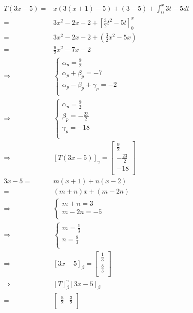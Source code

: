 \documentclass{article}
\begin{document}
\begin{equation*}
\begin{split}
T(3x-5) =&x(3(x+1)-5)+(3-5)+\int^x_0 3t-5 dt\\
=&3x^2-2x-2+\left[\frac{3}{2}t^2-5t\right]^x_0\\
=&3x^2-2x-2+(\frac{3}{2}x^2-5x)\\
=&\frac{9}{2}x^2-7x-2\\
\Rightarrow &\begin{cases}
\alpha_p=\frac{9}{2}\\
\alpha_p+\beta_p=-7\\
\alpha_p-\beta_p+\gamma_p=-2\\
\end{cases}\\
\Rightarrow &\begin{cases}
\alpha_p=\frac{9}{2}\\
\beta_p=-\frac{23}{2}\\
\gamma_p=-18\\
\end{cases}\\
\Rightarrow &\left[T(3x-5)\right]_\gamma=\begin{bmatrix}
\frac{9}{2}\\
-\frac{23}{2}\\
-18\\
\end{bmatrix}\\
3x-5 =& m(x+1)+n(x-2)\\
=&(m+n)x+(m-2n)\\
\Rightarrow &\begin{cases}
m+n=3\\
m-2n=-5\\
\end{cases}\\
\Rightarrow &\begin{cases}
m=\frac{1}{3}\\
n=\frac{8}{3}\\
\end{cases}\\
\Rightarrow &\left[3x-5\right]_\beta =\begin{bmatrix}
\frac{1}{3}\\
\frac{8}{3}\\
\end{bmatrix}\\
\Rightarrow &\left[T\right]^\gamma_\beta\left[3x-5\right]_\beta\\
=&\begin{bmatrix}
\frac{5}{2}&\frac{3}{2}\\

\end{bmatrix}
\end{split}
\end{equation*}
\end{document}
